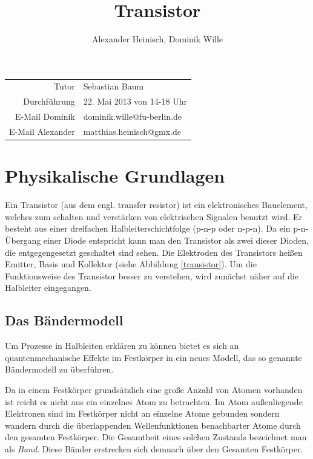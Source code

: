 \documentclass{article}
\title{Transistor}
\author{Alexander Heinisch, Dominik Wille}
\begin{document}
\maketitle
\vspace{13cm}
\noindent
\begin{center}
\begin{tabular}{r l}
Tutor & Sebastian Baum  \\
Durchführung & 22. Mai 2013 von 14-18 Uhr \\

E-Mail Dominik & dominik.wille@fu-berlin.de \\
E-Mail Alexander & matthias.heinisch@gmx.de \\
\end{tabular}
\end{center}

\newpage
\tableofcontents
\newpage

\section{Physikalische Grundlagen}
Ein Transistor (aus dem engl. transfer resistor) ist ein elektronisches Bauelement, welches zum
schalten und verstärken von elektrischen Signalen benutzt wird. Er besteht aus einer dreifachen
Halbleiterschichtfolge (p-n-p oder n-p-n). Da ein p-n-Übergang einer Diode entspricht kann man den 
Transistor als zwei dieser Dioden, die entgegengesetzt geschaltet sind sehen. Die Elektroden des
Transistors heißen Emitter, Basis und Kollektor (siehe Abbildung \ref{transistor}). Um die 
Funktionsweise des Transistor besser zu verstehen, wird zunächst näher auf die Halbleiter 
eingegangen.

\subsection{Das Bändermodell}
Um Prozesse in Halbleiten erklären zu können bietet es sich an quantenmechanische Effekte im Festkörper in ein neues Modell, das so genannte Bändermodell zu überführen.

Da in einem Festkörper grundsätzlich eine große Anzahl von Atomen vorhanden ist reicht es nicht aus ein einzelnes Atom zu betrachten. Im Atom außenliegende Elektronen sind im Festkörper nicht an einzelne Atome gebunden sondern wandern durch die überlappenden Wellenfunktionen benachbarter Atome durch den gesamten Festkörper. Die Gesamtheit eines solchen Zustands bezeichnet man als {\it Band}.
Diese Bänder erstrecken sich demnach über den Gesamten Festkörper. 
\end{document}
